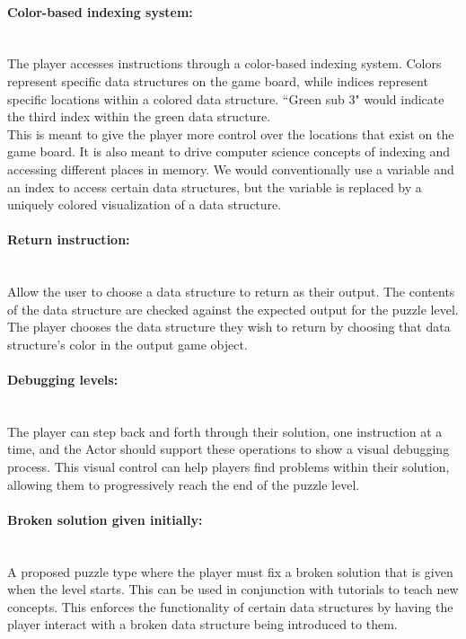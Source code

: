 \paragraph{Color-based indexing system:} ~\\
The player accesses instructions through a color-based indexing system. Colors represent specific data structures on the game board, while indices represent specific locations within a colored data structure. ``Green sub 3" would indicate the third index within the green data structure.\\

This is meant to give the player more control over the locations that exist on the game board. It is also meant to drive computer science concepts of indexing and accessing different places in memory. We would conventionally use a variable and an index to access certain data structures, but the variable is replaced by a uniquely colored visualization of a data structure.\\

\paragraph{Return instruction:} ~\\
Allow the user to choose a data structure to return as their output. The contents of the data structure are checked against the expected output for the puzzle level. The player chooses the data structure they wish to return by choosing that data structure's color in the output game object.\\

\paragraph{Debugging levels:} ~\\
The player can step back and forth through their solution, one instruction at a time, and the Actor should support these operations to show a visual debugging process. This visual control can help players find problems within their solution, allowing them to progressively reach the end of the puzzle level.\\

\paragraph{Broken solution given initially:} ~\\
A proposed puzzle type where the player must fix a broken solution that is given when the level starts. This can be used in conjunction with tutorials to teach new concepts. This enforces the functionality of certain data structures by having the player interact with a broken data structure being introduced to them.\\

